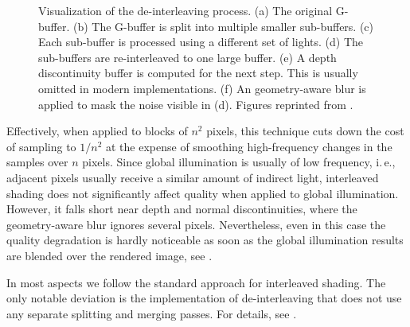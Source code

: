 \begin{figure}[htb]
\begin{subfigure}[b]{0.33\textwidth}
    \caption{\label{fig:concept:interleaved_segovia_6}}
  \end{subfigure}
  \caption{Visualization of the de-interleaving process. (a) The original G-buffer. (b) The G-buffer is split into multiple smaller sub-buffers. (c) Each sub-buffer is processed using a different set of lights. (d) The sub-buffers are re-interleaved to one large buffer. (e) A depth discontinuity buffer is computed for the next step. This is usually omitted in modern implementations. (f) An geometry-aware blur is applied to mask the noise visible in (d). Figures reprinted from \citet{segovia2006non}.}
  \label{fig:concept:interleaved_segovia}
\end{figure}


Effectively, when applied to blocks of $n^2$ pixels, this technique cuts down the cost of sampling to $ 1 / n^2 $ at the expense of smoothing high-frequency changes in the samples over $n$ pixels. Since global illumination is usually of low frequency, i.\,e., adjacent pixels usually receive a similar amount of indirect light, interleaved shading does not significantly affect quality when applied to global illumination. However, it falls short near depth and normal discontinuities, where the geometry-aware blur ignores several pixels. Nevertheless, even in this case the quality degradation is hardly noticeable as soon as the global illumination results are blended over the rendered image, see .

In most aspects we follow the standard approach for interleaved shading. The only notable deviation is the implementation of de-interleaving that does not use any separate splitting and merging passes. For details, see .
